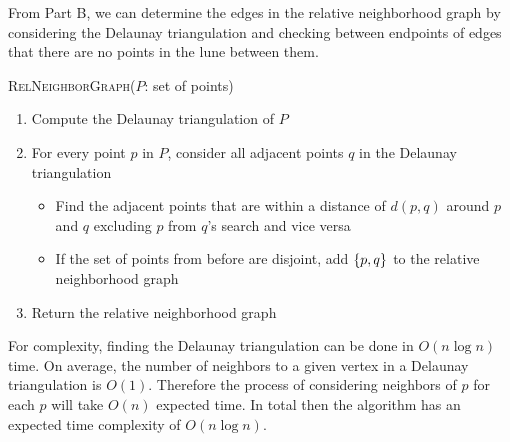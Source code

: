 \documentclass[12pt]{extarticle}
\begin{document}
\begin{solution}
    From Part B, we can determine the edges in the relative neighborhood graph by considering the Delaunay triangulation and checking between endpoints of edges that there are no points in the lune between them. 
    \begin{algorithm}[H]
        \caption{\textsc{RelNeighborGraph}($P$: set of points)}
        \begin{enumerate}
            \item Compute the Delaunay triangulation of $P$
            \item For every point $p$ in $P$, consider all adjacent points $q$ in the Delaunay triangulation
                \begin{itemize}
                    \item Find the adjacent points that are within a distance of $d(p,q)$ around $p$ and $q$ excluding $p$ from $q$'s search and vice versa
                    \item If the set of points from before are disjoint, add $\qty{p,q}$ to the relative neighborhood graph
                \end{itemize}
            \item Return the relative neighborhood graph
        \end{enumerate}
    \end{algorithm}

    For complexity, finding the Delaunay triangulation can be done in $O(n \log n)$ time. On average, the number of neighbors to a given vertex in a Delaunay triangulation is $O(1)$. Therefore the process of considering neighbors of $p$ for each $p$ will take $O(n)$ expected time. In total then the algorithm has an expected time complexity of $O(n \log n)$.
\end{solution}
\end{document}
